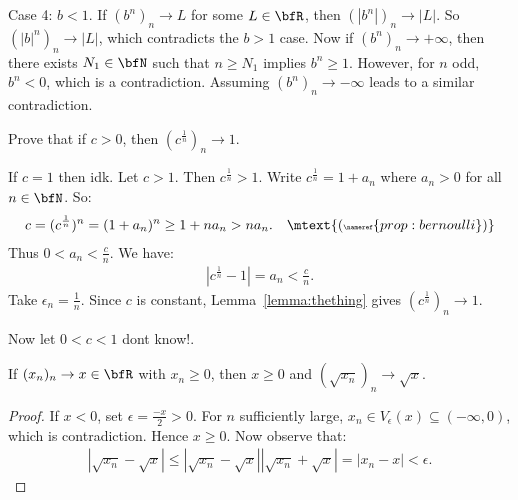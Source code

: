 \begin{solution}
            Case 4: $b < 1$. If $(b^n)_n \rightarrow L$ for some $L \in \bfR$, then $(|b^n|)_n \rightarrow |L|$. So $(|b|^n)_n \rightarrow |L|$, which contradicts the $b>1$ case. Now if $(b^n)_n \rightarrow +\infty$, then there exists $N_1 \in \bfN$ such that $n \geq N_1$ implies $b^n \geq 1$. However, for $n$ odd, $b^n < 0$, which is a contradiction. Assuming $(b^n)_n \rightarrow -\infty$ leads to a similar contradiction.
        \end{solution}

    \begin{example}
        Prove that if $c>0$, then $(c^{\frac{1}{n}})_n \rightarrow 1$.
    \end{example}
        \begin{solution}
            If $c=1$ then {\color{red} idk}. Let $c > 1$. Then $c^{\frac{1}{n}} > 1$. Write $c^{\frac{1}{n}} = 1 + a_n$ where $a_n > 0$ for all $n \in \bfN$. So:
                \begin{equation*}
                \begin{split}
                    c = (c^\frac{1}{n})^n = (1+a_n)^n \geq 1+na_n > na_n. \quad \mtext{\tiny (\nameref{prop:bernoulli})}
                \end{split}
                \end{equation*}
            Thus $0 < a_n < \frac{c}{n}$. We have:
                \begin{equation*}
                \begin{split}
                    \left|c^{\frac{1}{n}} - 1\right| = a_n < \frac{c}{n}.
                \end{split}
                \end{equation*}
            Take $\epsilon_n = \frac{1}{n}$. Since $c$ is constant, Lemma~\ref{lemma:thething} gives $(c^\frac{1}{n})_n \rightarrow 1$.

            Now let $0 < c < 1$ {\color{red} dont know!}.
        \end{solution}

    \begin{lemma}
        If $(x_n)_n \rightarrow x \in \bfR$ with $x_n \geq 0$, then $x\geq 0$ and $(\sqrt{x_n})_n \rightarrow \sqrt{x}$.
    \end{lemma}
        \begin{proof}
            If $x<0$, set $\epsilon = \frac{-x}{2} > 0$. For $n$ sufficiently large, $x_n \in V_\epsilon(x) \subseteq (-\infty,0)$, which is contradiction. Hence $x \geq 0$. Now observe that:
                \begin{equation*}
                \begin{split}
                    |\sqrt{x_n} - \sqrt{x}| \leq |\sqrt{x_n} - \sqrt{x}||\sqrt{x_n} + \sqrt{x}| = |x_n - x| < \epsilon.
                \end{split}
                \end{equation*}
        \end{proof}

